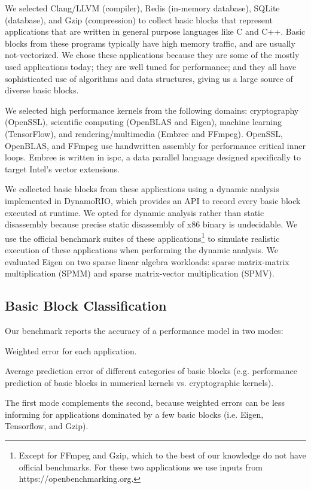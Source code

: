 We selected Clang/LLVM\cite{llvm} (compiler),
Redis (in-memory database), SQLite (database), and Gzip (compression)
to collect basic blocks that represent
applications that are written in general purpose languages
like C and C++.
Basic blocks from these programs
typically have high memory traffic, and are usually not-vectorized.
We chose these applications because they are some of the mostly used
applications today; they are well tuned for performance;
and they all have sophisticated use of algorithms and data structures,
giving us a large source of diverse basic blocks.

We selected high performance kernels from the following domains:
cryptography (OpenSSL), scientific computing (OpenBLAS and Eigen),
machine learning (TensorFlow\cite{tensorflow}),
and rendering/multimedia (Embree\cite{embree} and FFmpeg).
OpenSSL, OpenBLAS, and FFmpeg use handwritten assembly for performance critical inner loops.
Embree is written in ispc\cite{ispc}, a data parallel language
designed specifically to target Intel's vector extensions.

We collected basic blocks from these applications using
a dynamic analysis implemented in DynamoRIO\cite{dynamorio},
which provides an API to record every basic block
executed at runtime.
We opted for dynamic analysis rather than static disassembly
because precise static disassembly of x86 binary
is undecidable.
We use the official benchmark suites of these applications\footnote{
Except for FFmpeg and Gzip, which to the best of our knowledge do not have
official benchmarks. For these two applications we use inputs
from https://openbenchmarking.org.
} to simulate realistic execution of these applications when performing
the dynamic analysis.
We evaluated Eigen on two sparse linear algebra workloads:
sparse matrix-matrix multiplication (SPMM) and 
sparse matrix-vector multiplication (SPMV).

\subsection{Basic Block Classification}\label{classification}
Our benchmark reports the accuracy of a performance model in two modes:
\begin{enumerate*}
\item Weighted error for each application.
\item Average prediction error of different categories of 
basic blocks (e.g. performance prediction
of basic blocks in numerical kernels vs.
cryptographic kernels).
\end{enumerate*}
The first mode complements the second,
because weighted errors can be less informing 
for applications dominated by a few basic blocks
(i.e. Eigen, Tensorflow, and Gzip).


